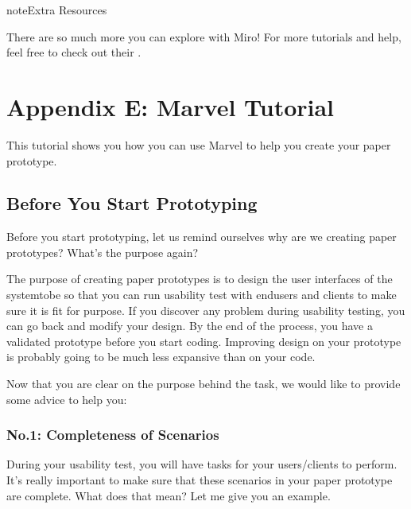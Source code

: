 \documentclass[letterpaper,10pt,english]{jupyterBook}
\begin{document}
\begin{sphinxadmonition}{note}{Extra Resources}

\sphinxAtStartPar
There are so much more you can explore with Miro!  For more tutorials and help,
feel free to check out their .
\end{sphinxadmonition}


\chapter{Appendix E: Marvel Tutorial}
\label{\detokenize{appendices/appendix_e/marvel_guide:appendix-e-marvel-tutorial}}\label{\detokenize{appendices/appendix_e/marvel_guide::doc}}
\sphinxAtStartPar
This tutorial shows you how you can use Marvel to help you create your paper prototype.


\section{Before You Start Prototyping}
\label{\detokenize{appendices/appendix_e/marvel_guide:before-you-start-prototyping}}
\sphinxAtStartPar
Before you start prototyping, let us remind ourselves \sphinxhyphen{} why are we creating paper prototypes?  What’s the purpose
again?

\sphinxAtStartPar
The purpose of creating paper prototypes is to design the user interfaces of the system\sphinxhyphen{}to\sphinxhyphen{}be so that you can run
usability test with end\sphinxhyphen{}users and clients to make sure it is fit for purpose. If you discover any problem during
usability testing, you can go back and modify your design.  By the end of the process, you have a validated
prototype before you start coding.  Improving design on your prototype is probably going to be much less expansive
than on your code.

\sphinxAtStartPar
Now that you are clear on the purpose behind the task, we would like to provide some advice to help you:


\subsection{No.1: Completeness of Scenarios}
\label{\detokenize{appendices/appendix_e/marvel_guide:no-1-completeness-of-scenarios}}
\sphinxAtStartPar
During your usability test, you will have tasks for your users/clients to perform. It’s really important to make
sure that these scenarios in your paper prototype are complete. What does that mean? Let me give you an example.
\end{document}
